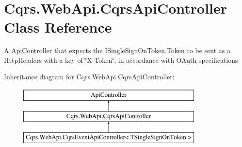 \hypertarget{classCqrs_1_1WebApi_1_1CqrsApiController}{}\section{Cqrs.\+Web\+Api.\+Cqrs\+Api\+Controller Class Reference}
\label{classCqrs_1_1WebApi_1_1CqrsApiController}


A Api\+Controller that expects the I\+Single\+Sign\+On\+Token.\+Token to be sent as a Http\+Headers with a key of \char`\"{}\+X-\/\+Token\char`\"{}, in accordance with O\+Auth specifications  


Inheritance diagram for Cqrs.\+Web\+Api.\+Cqrs\+Api\+Controller\+:\begin{figure}[H]
\begin{center}
\leavevmode
\includegraphics[height=3.000000cm]{classCqrs_1_1WebApi_1_1CqrsApiController}
\end{center}
\end{figure}
